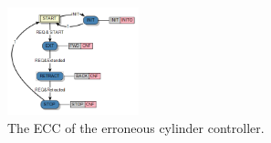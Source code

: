 \begin{bibunit}
\begin{figure}[t]
    \centering
    \includegraphics[width=0.34\textwidth]{MX_Papers/Paper3/pic/errctlecc.png}
    \caption{The ECC of the erroneous cylinder controller.}
    \label{fig:errctlecc}
\end{figure}










\end{bibunit}
